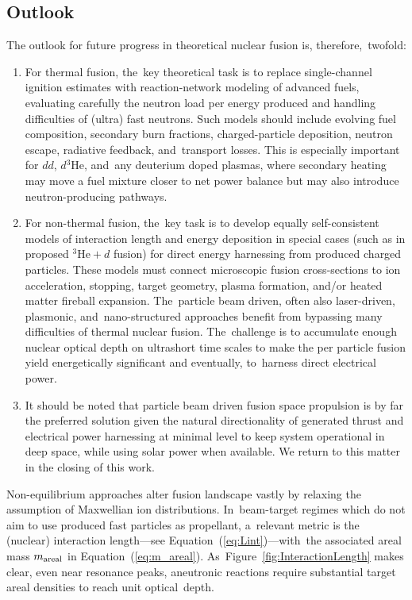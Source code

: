 \documentclass[particles,article,accept,pdftex,moreauthors]{Definitions/mdpi}
\begin{document}
\subsection{Outlook}
The outlook for future progress in theoretical nuclear fusion is, therefore,~twofold:
\begin{enumerate}
\item 
For thermal fusion, the~key theoretical task is to replace single-channel ignition estimates with reaction-network modeling of advanced fuels, evaluating carefully the neutron load per energy produced and handling difficulties of (ultra) fast neutrons. Such models should include evolving fuel composition, secondary burn fractions, charged-particle deposition, neutron escape, radiative feedback, and~transport losses. This is especially important for $dd$, $d{}^3\mathrm{He}$, and~any deuterium doped plasmas, where secondary heating may move a fuel mixture closer to net power balance but may also introduce neutron-producing pathways.
\item 
For non-thermal fusion, the~key task is to develop equally self-consistent models of interaction length and energy deposition in special cases (such as in proposed ${}^3\mathrm{He}+d$ fusion) for direct energy harnessing from produced charged particles. These models must connect microscopic fusion cross-sections to ion acceleration, stopping, target geometry, plasma formation, and/or heated matter fireball expansion. The~particle beam driven, often also laser-driven, plasmonic, and~nano-structured approaches benefit from bypassing many difficulties of thermal nuclear fusion. The~challenge is to accumulate enough nuclear optical depth on ultrashort time scales to make the per particle fusion yield energetically significant and eventually, to~harness direct electrical power.
\item
It should be noted that particle beam driven fusion space propulsion is by far the preferred solution given the natural directionality of generated thrust and electrical power harnessing at minimal level to keep system operational in deep space, while using solar power when available. We return to this matter in the closing of this work.
\end{enumerate}

Non-equilibrium approaches alter fusion landscape vastly by relaxing the assumption of Maxwellian ion distributions. In~beam-target regimes which do not aim to use produced fast particles as propellant, a~relevant metric is the (nuclear) interaction length---see \mbox{Equation~(\ref{eq:Lint})}---with~the associated areal mass $m_{\rm areal}$ in Equation~(\ref{eq:m_areal}). As~Figure~\ref{fig:InteractionLength} makes clear, even near resonance peaks, aneutronic reactions require substantial target areal densities to reach unit optical~depth.
\end{document}
